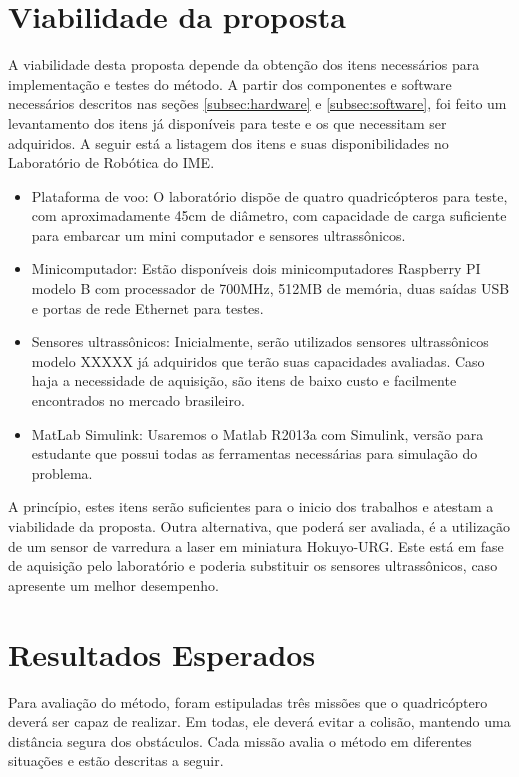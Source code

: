 \documentclass[a4paper, 12pt]{article}
\begin{document}
\newpage

\section{Viabilidade da proposta}
\label{sec:viabilidade}

A viabilidade desta proposta depende da obtenção dos itens necessários para implementação e testes do método. A partir dos componentes e software necessários descritos nas seções \ref{subsec:hardware} e \ref{subsec:software}, foi feito um levantamento dos itens já disponíveis para teste e os que necessitam ser adquiridos. A seguir está a listagem dos itens e suas disponibilidades no Laboratório de Robótica do IME.

\begin{itemize}
	\item
	Plataforma de voo:  O laboratório dispõe de quatro quadricópteros para teste, com aproximadamente 45cm de diâmetro, com capacidade de carga suficiente para embarcar um mini computador e sensores ultrassônicos.
	\item
	Minicomputador: Estão disponíveis dois minicomputadores Raspberry PI modelo B com processador de 700MHz, 512MB de memória, duas saídas USB e portas de rede Ethernet para testes.
	\item
	Sensores ultrassônicos: Inicialmente, serão utilizados sensores ultrassônicos modelo XXXXX já adquiridos que terão suas capacidades avaliadas. Caso haja a necessidade de aquisição, são itens de baixo custo e facilmente encontrados no mercado brasileiro.
	\item
	MatLab Simulink: Usaremos o Matlab R2013a com Simulink, versão para estudante que possui todas as ferramentas necessárias para simulação do problema. 

\end{itemize}

A princípio, estes itens serão suficientes para o inicio dos trabalhos e atestam a viabilidade da proposta. Outra alternativa, que poderá ser avaliada, é a utilização de um sensor de varredura a laser em miniatura Hokuyo-URG. Este está em fase de aquisição pelo laboratório e poderia substituir os sensores ultrassônicos, caso apresente um melhor desempenho.

\newpage

\section{Resultados Esperados}
\label{sec:resultados}
 Para avaliação do método, foram estipuladas três missões que o quadricóptero deverá ser capaz de realizar. Em todas, ele deverá evitar a colisão, mantendo uma distância segura dos obstáculos. Cada missão avalia o método em diferentes situações e estão descritas a seguir.
 
\end{document}
